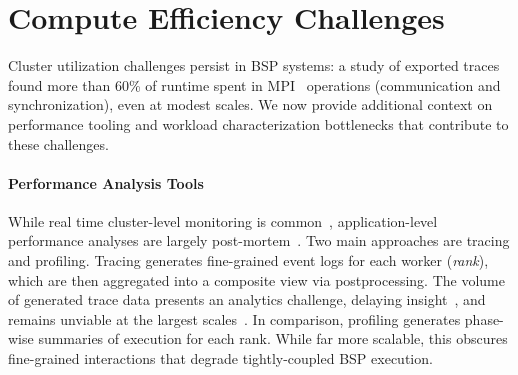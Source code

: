 \section{Compute Efficiency Challenges}
\label{sec:bg:compute}

Cluster utilization challenges persist in BSP systems: a study of exported traces found more than
60\% of runtime spent in MPI~\cite{:MPI} operations (communication and synchronization), even at
modest scales.
We now provide additional context on performance tooling and workload characterization bottlenecks
that contribute to these challenges.


\paragraph{Performance Analysis Tools}
While real time cluster-level monitoring is common~\cite{Schwa2021:LDMS}, application-level
performance analyses are largely
post-mortem~\cite{Wylie2025:15Years,Shend2006:TAU,2025:kineto,:HTA,Knupf2012:Score-P,Boehm2016:Caliper}.
Two main approaches are tracing and profiling.
Tracing generates fine-grained event logs for each worker (\emph{rank}), which are then aggregated
into a composite view via postprocessing.
The volume of generated trace data presents an analytics challenge, delaying
insight~\cite{Devar2024:DFTracer}, and remains unviable at the largest
scales~\cite{Cui2026:Flare}.
In comparison, profiling generates phase-wise summaries of execution for each rank.
While far more scalable, this obscures fine-grained interactions that degrade tightly-coupled BSP
execution.

